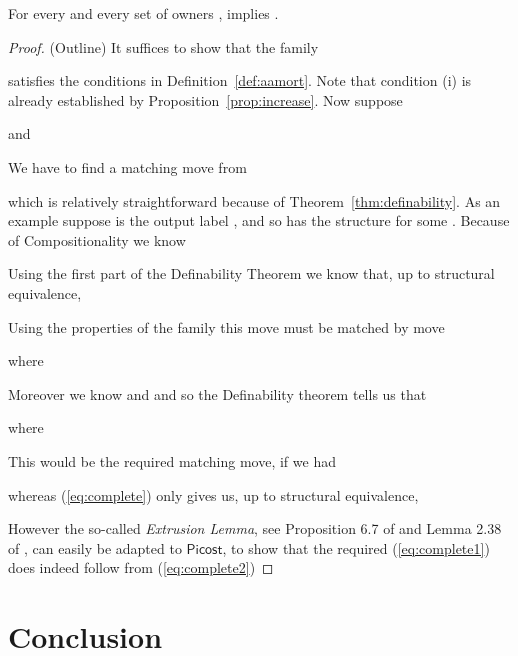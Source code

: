 \documentclass{LMCS}
\newcommand{\pfn}[1]{\mathsf{#1}}  \newcommand{\cfn}[1]{\mathsf{#1}}  \newcommand{\ownfnt}[1]{{\mathsf{#1}}}
\newcommand{\picost}{\ensuremath{\pfn{Picost}}\xspace}
\begin{document}
\begin{thm}[Completeness]
   For every   and every set of owners ,   implies 
 .
\end{thm}
\begin{proof}(Outline)
  It suffices to show that the family 
  
satisfies the conditions  in Definition~\ref{def:aamort}.
Note that condition (i) is already established by Proposition~\ref{prop:increase}.
Now suppose

and 

We have to find a matching move from 

which is relatively straightforward because of Theorem~\ref{thm:definability}. As an example
suppose  is the output label  , and so  has the structure
 for some . 
Because of Compositionality we know 

Using the first part of the Definability Theorem we know that, up to structural
equivalence,


Using the properties of the family  this move must be matched by move
 
where 

Moreover we know 
 and  and so  the Definability theorem tells us that
 
where 
 
This would be the required matching move, if we had

whereas (\ref{eq:complete}) only gives us, up to structural equivalence,  

However the so-called \emph{Extrusion Lemma}, see  Proposition 6.7 of \cite{pityping} and Lemma 2.38 of \cite{dpibook},
can easily be adapted to \picost, to show that the required (\ref{eq:complete1}) does indeed follow from
(\ref{eq:complete2})
\end{proof}

\section{Conclusion}
\end{document}
